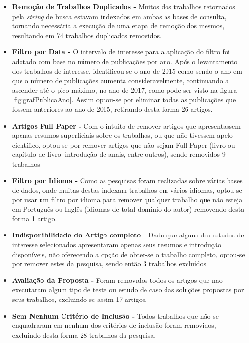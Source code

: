 \documentclass[ti,table]{texufpel} %
\begin{document}
\begin{itemize} 

\item  \textbf{Remoção de Trabalhos Duplicados - } Muitos dos trabalhos retornados pela \textit{string} de busca estavam indexados em ambas as bases de consulta, tornando necessária a execução de uma etapa de remoção dos mesmos, resultando em 74 trabalhos duplicados removidos. 

  

\item  \textbf{Filtro por Data - } O intervalo de interesse para a aplicação do filtro foi adotado com base no número de publicações por ano. Após o levantamento dos trabalhos de interesse, identificou-se o ano de 2015 como sendo o ano em que o número de publicações aumenta consideravelmente, continuando a ascender até o pico máximo, no ano de 2017, como pode ser visto na figura \ref{fig:grafPublicaAno}. Assim optou-se por eliminar todas as publicações que fossem anteriores ao ano de 2015, retirando desta forma 26 artigos.     

  

\item  \textbf{Artigos Full Paper - } Com o intuito de remover artigos que apresentassem apenas resumos superficiais sobre os trabalhos, ou que não tivessem apelo científico, optou-se por remover artigos que não sejam Full Paper (livro ou capítulo de livro, introdução de anais, entre outros), sendo removidos 9 trabalhos. 

  

\item  \textbf{Filtro por Idioma - } Como as pesquisas foram realizadas sobre várias bases de dados, onde muitas destas indexam trabalhos em vários idiomas, optou-se por usar um filtro por idioma para remover qualquer trabalho que não esteja em Português ou Inglês (idiomas de total domínio do autor) removendo desta forma 1 artigo. 

  

\item  \textbf{Indisponibilidade do Artigo completo - } Dado que alguns dos estudos de interesse selecionados apresentaram apenas seus resumos e introdução disponíveis, não oferecendo a opção de obter-se o trabalho completo, optou-se por remover estes da pesquisa, sendo então 3 trabalhos excluídos. 

  

\item  \textbf{Avaliação da Proposta - } Foram removidos todos os artigos que não executaram algum tipo de teste ou estudo de caso das soluções propostas por seus trabalhos, excluindo-se assim 17 artigos. 

  

\item  \textbf{Sem Nenhum Critério de Inclusão - } Todos trabalhos que não  se enquadraram em nenhum dos critérios de inclusão foram removidos, excluindo desta forma 28 trabalhos da pesquisa. 

     

  

\end{itemize} 
\end{document}
